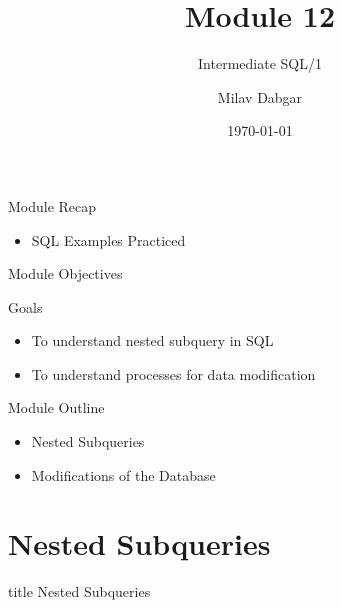 \documentclass[aspectratio=169, xcolor=dvipsnames]{beamer}
\title{Module 12}
\subtitle{Intermediate SQL/1}
\author{Milav Dabgar}
\institute{www.milav.in}
\date{\today}
\begin{document}
\begin{frame}
    \titlepage
\end{frame}

\begin{frame}{Module Recap}
    \begin{itemize}[<+->]
        \item SQL Examples Practiced
    \end{itemize}
\end{frame}

\begin{frame}{Module Objectives}
    \begin{block}{Goals}
        \begin{itemize}[<+->]
            \item To understand nested subquery in SQL
            \item To understand processes for data modification
        \end{itemize}
    \end{block}
\end{frame}

\begin{frame}{Module Outline}
    \begin{itemize}[<+->]
        \item Nested Subqueries
        \item Modifications of the Database
    \end{itemize}
\end{frame}

\section{Nested Subqueries}

\begin{frame}
  \vfill
  \centering
  \begin{beamercolorbox}[sep=8pt,center,shadow=true,rounded=true]{title}
    Nested Subqueries\par%
  \end{beamercolorbox}
  \vfill
\end{frame}
\end{document}
